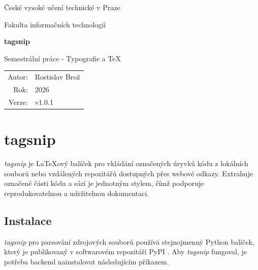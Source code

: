 \documentclass{article}
\begin{document}
\hypersetup{pageanchor=false}
\begin{titlepage}
    \centering

    {\Large České vysoké učení technické v Praze\par}
    {\Large Fakulta informačních technologií\par}

    \vspace{3cm}

    {\Huge\bfseries tagsnip\par}

    \vspace{0.5cm}

    {\Large Semestrální práce - Typografie a \TeX\par}

    \vfill

    \begin{tabular}{rl}
        Autor: & Rostislav Brož \\
        Rok: & 2026 \\
        Verze: & v1.0.1 \\
    \end{tabular}

    \vspace{2cm}
\end{titlepage}

\hypersetup{pageanchor=true}
\clearpage
{}

\section*{tagsnip}

\textit{tagsnip} je La\TeX{}ový balíček pro vkládání označených úryvků kódu z lokálních souborů 
nebo vzdálených repozitářů dostupných přes webové odkazy. 
Extrahuje označené části kódu a sází je jednotným stylem, 
čímž podporuje reprodukovatelnou a udržitelnou dokumentaci.

\subsection*{Instalace}

\textit{tagsnip} pro parsování zdrojových souborů používá stejnojmenný Python balíček,
který je publikovaný v softwarovém repozitáři PyPI \citep{pypi}. 
Aby \textit{tagsnip} fungoval, je potřeba backend nainstalovat následujícím příkazem.

\end{document}
